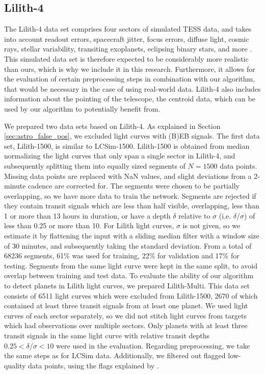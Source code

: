 \subsection{Lilith-4}
\label{sec:lilith-4}

The Lilith-4 data set comprises four sectors of simulated TESS data, and takes into account readout errors, spacecraft jitter, focus errors, diffuse light, cosmic rays, stellar variability, transiting exoplanets, eclipsing binary stars, and more \citep{smith2019four}. This simulated data set is therefore expected to be considerably more realistic than ours, which is why we include it in this research.   Furthermore, it allows for the evaluation of certain preprocessing steps in combination with our algorithm, that would be necessary in the case of using real-world data. Lilith-4 also includes information about the pointing of the telescope, the centroid data, which can be used by our algorithm to potentially benefit from.

We prepared two data sets based on Lilith-4. As explained in Section \ref{sec:astro_false_pos}, we excluded light curves with (B)EB signals. The first data set, Lilith-1500, is similar to LCSim-1500. Lilith-1500 is obtained from median normalizing the light curves that only span a single sector in Lilith-4, and subsequently splitting them into equally sized segments of $N=1500$ data points. Missing data points are replaced with NaN values, and slight deviations from a 2-minute cadence are corrected for. The segments were chosen to be partially overlapping, so we have more data to train the network. Segments are rejected if they contain transit signals which are less than half visible, overlapping, less than 1 or more than 13 hours in duration, or have a depth $\delta$ relative to $\sigma$ (i.e. $\delta/\sigma$) of less than 0.25 or more than 10. For Lilith light curves, $\sigma$  is not given, so we estimate it by flattening the input with a sliding median filter with a window size of 30 minutes, and subsequently taking the standard deviation. From a total of 68236 segments, 61\% was used for training, 22\% for validation and 17\% for testing. Segments from the same light curve were kept in the same split, to avoid overlap between training and test data. To evaluate the ability of our algorithm to detect planets in Lilith light curves, we prepared Lilith-Multi. This data set consists of 6511 light curves which were excluded from Lilith-1500, 2670 of which contained at least three transit signals from at least one planet. We used light curves of each sector separately, so we did not stitch light curves from targets which had observations over multiple sectors. Only planets with at least three transit signals in the same light curve with relative transit depths $0.25 < \delta/\sigma < 10$ were used in the evaluation. Regarding preprocessing, we take the same steps as for LCSim data. Additionally, we filtered out flagged low-quality data points, using the flags explained by \cite{tenenbaum2018tess}.


